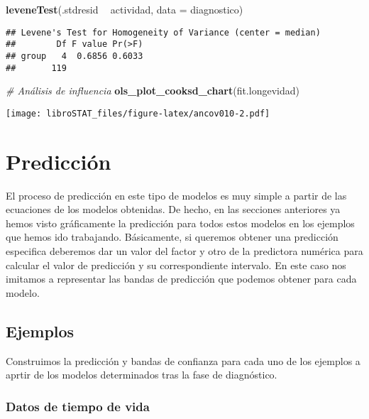 \documentclass[
]{book}
\newenvironment{Shaded}{\begin{snugshade}}{\end{snugshade}}
\newcommand{\CommentTok}[1]{\textcolor[rgb]{0.56,0.35,0.01}{\textit{#1}}}
\newcommand{\DataTypeTok}[1]{\textcolor[rgb]{0.13,0.29,0.53}{#1}}
\newcommand{\KeywordTok}[1]{\textcolor[rgb]{0.13,0.29,0.53}{\textbf{#1}}}
\newcommand{\NormalTok}[1]{#1}
\newcommand{\OperatorTok}[1]{\textcolor[rgb]{0.81,0.36,0.00}{\textbf{#1}}}
\newcommand{\StringTok}[1]{\textcolor[rgb]{0.31,0.60,0.02}{#1}}
\theoremstyle{definition}
\theoremstyle{definition}
\theoremstyle{definition}
\theoremstyle{remark}
\begin{document}
\begin{Shaded}
\begin{Highlighting}[]
\KeywordTok{leveneTest}\NormalTok{(.stdresid }\OperatorTok{~}\StringTok{ }\NormalTok{actividad, }\DataTypeTok{data =}\NormalTok{ diagnostico)}
\end{Highlighting}
\end{Shaded}

\begin{verbatim}
## Levene's Test for Homogeneity of Variance (center = median)
##        Df F value Pr(>F)
## group   4  0.6856 0.6033
##       119
\end{verbatim}

\begin{Shaded}
\begin{Highlighting}[]
\CommentTok{# Análisis de influencia}
\KeywordTok{ols_plot_cooksd_chart}\NormalTok{(fit.longevidad)}
\end{Highlighting}
\end{Shaded}

\texttt{[image: libroSTAT\_files/figure-latex/ancov010-2.pdf]}

\hypertarget{predicciuxf3n}{%
\section{Predicción}\label{predicciuxf3n}}

El proceso de predicción en este tipo de modelos es muy simple a partir de las ecuaciones de los modelos obtenidas. De hecho, en las secciones anteriores ya hemos visto gráficamente la predicción para todos estos modelos en los ejemplos que hemos ido trabajando. Básicamente, si queremos obtener una predicción especifica deberemos dar un valor del factor y otro de la predictora numérica para calcular el valor de predicción y su correspondiente intervalo. En este caso nos imitamos a representar las bandas de predicción que podemos obtener para cada modelo.

\hypertarget{ejemplos-2}{%
\subsection{Ejemplos}\label{ejemplos-2}}

Construimos la predicción y bandas de confianza para cada uno de los ejemplos a aprtir de los modelos determinados tras la fase de diagnóstico.

\hypertarget{datos-de-tiempo-de-vida-2}{%
\subsubsection{Datos de tiempo de vida}\label{datos-de-tiempo-de-vida-2}}
\end{document}
